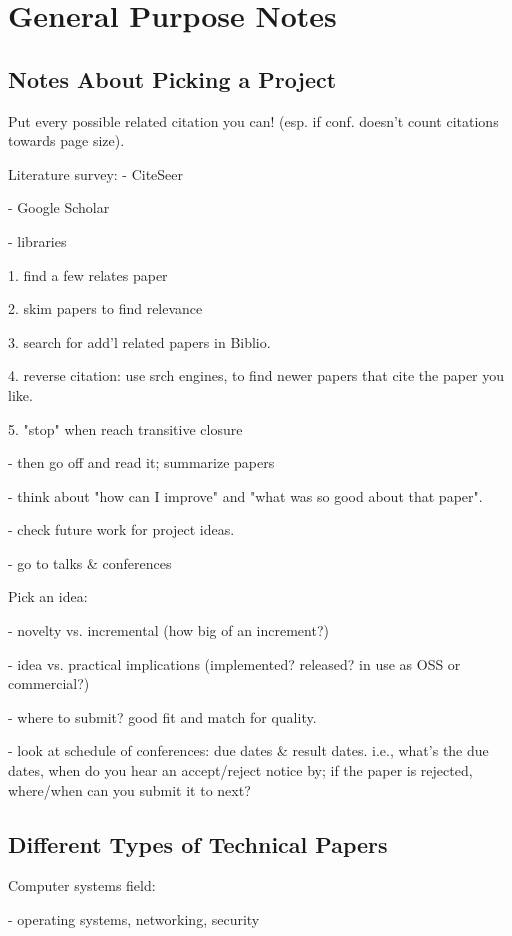 \section{General Purpose Notes}

\subsection{Notes About Picking a Project}

Put every possible related citation you can! (esp. if conf.
doesn't count citations towards page size).

Literature survey:
- CiteSeer

- Google Scholar

- libraries

1. find a few relates paper

2. skim papers to find relevance

3. search for add'l related papers in Biblio.

4. reverse citation: use srch engines, to find
   newer papers that cite the paper you like.

5. "stop" when reach transitive closure

- then go off and read it; summarize papers

- think about "how can I improve" and "what was so
  good about that paper".

- check future work for project ideas.

- go to talks \& conferences

Pick an idea:

- novelty vs. incremental (how big of an increment?)

- idea vs. practical implications
  (implemented? released? in use as OSS or commercial?)

- where to submit? good fit and match for quality.

- look at schedule of conferences: due dates \& result dates.
i.e., what's the due dates, when do you hear an accept/reject
notice by; if the paper is rejected, where/when can you submit
it to next?

\subsection{Different Types of Technical Papers}

Computer systems field:

- operating systems, networking, security

